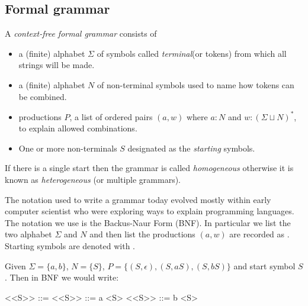\subsection{Formal grammar}
A \emph{context-free formal grammar} consists of 
\begin{itemize}
    \item {} a (finite) alphabet $\Sigma$ of symbols called \emph{terminal}(or tokens) from which all strings will be made.
    \item {} a (finite) alphabet $N$ of non-terminal symbols
    used to name how tokens can be combined.
    \item {} productions $P$, a list of ordered pairs 
    $(a,w)$ where $a:N$ and $w:(\Sigma\sqcup N)^*$, to explain allowed 
    combinations.
    \item One or more non-terminals $S$ designated as the \emph{starting}
    symbols.
\end{itemize}
If there is a single start then the grammar is called \emph{homogeneous}
otherwise it is known as \emph{heterogeneous} (or multiple grammars).

The notation used to write a grammar today evolved mostly within early 
computer scientist who were exploring ways to explain programming languages.
The notation we use is the Backus-Naur Form (BNF).
In particular we list the two alphabet $\Sigma$ and $N$ and then list the productions $(a,w)$ are recorded as .  Starting symbols 
are denoted with .




\begin{example}
    Given $\Sigma=\{a,b\}$, $N=\{S\}$, $P=\{(S,\epsilon),(S,aS), (S,bS)\}$
    and start symbol $S$.  Then in BNF we would write:
\begin{Gcode}[]
<<S>> ::= 
<<S>> ::= a <S>
<<S>> ::= b <S>
\end{Gcode}
\end{example}

